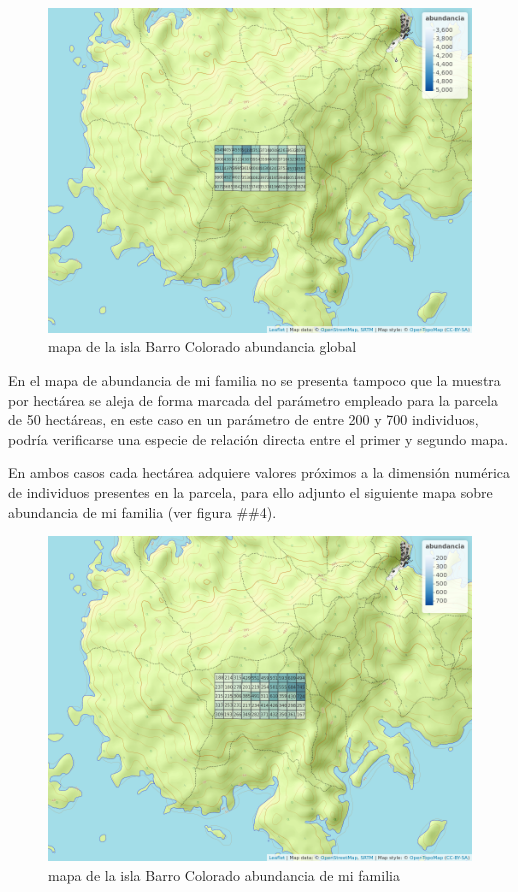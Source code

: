 \documentclass[11pt,]{article}
\begin{document}
\begin{figure}
\centering
\includegraphics[width=1.00000\textwidth]{mapa_cuadros_abun_global.png}
\caption{mapa de la isla Barro Colorado abundancia global
\label{fig:bci_map}}
\end{figure}

En el mapa de abundancia de mi familia no se presenta tampoco que la
muestra por hectárea se aleja de forma marcada del parámetro empleado
para la parcela de 50 hectáreas, en este caso en un parámetro de entre
200 y 700 individuos, podría verificarse una especie de relación directa
entre el primer y segundo mapa.

En ambos casos cada hectárea adquiere valores próximos a la dimensión
numérica de individuos presentes en la parcela, para ello adjunto el
siguiente mapa sobre abundancia de mi familia (ver figura \#\#4).

\begin{figure}
\centering
\includegraphics[width=1.00000\textwidth]{mapa_cuadros_abun_mi_familia.png}
\caption{mapa de la isla Barro Colorado abundancia de mi familia
\label{fig:bci_map}}
\end{figure}
\end{document}
